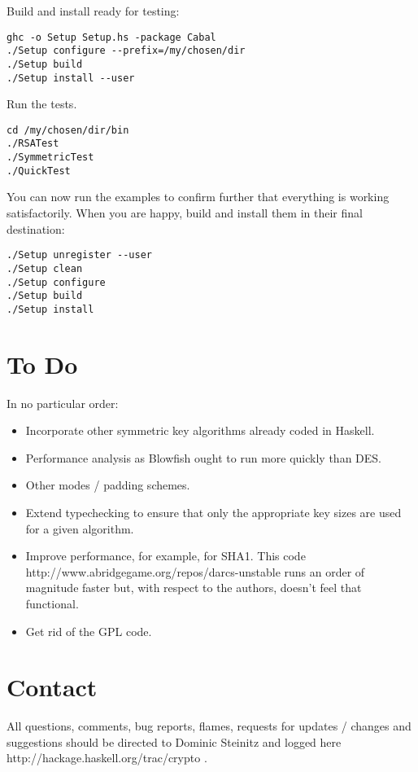 \documentclass{article}
\begin{document}
Build and install ready for testing:

\begin{lstlisting}[frame=single]
ghc -o Setup Setup.hs -package Cabal
./Setup configure --prefix=/my/chosen/dir
./Setup build
./Setup install --user
\end{lstlisting}

Run the tests.

\begin{lstlisting}[frame=single]
cd /my/chosen/dir/bin
./RSATest
./SymmetricTest
./QuickTest
\end{lstlisting}

You can now run the examples to confirm further that everything
is working satisfactorily.
When you are happy, build and install them in
their final destination:

\begin{lstlisting}[frame=single]
./Setup unregister --user
./Setup clean
./Setup configure
./Setup build
./Setup install
\end{lstlisting}

\section{To Do}

In no particular order:

\begin{itemize}
\item
Incorporate other symmetric key algorithms already coded in Haskell.
\item
Performance analysis as Blowfish ought to run more quickly than DES.
\item
Other modes / padding schemes.
\item
Extend typechecking to ensure that only the appropriate key sizes are used
for a given algorithm.
\item
Improve performance, for example, for SHA1. This 
\htmladdnormallinkfoot
{code}
{http://www.abridgegame.org/repos/darcs-unstable}
runs an order of magnitude faster but, with respect to the authors, doesn't
feel that functional.
\item
Get rid of the GPL code.
\end{itemize}

\section{Contact}

All questions, comments, bug reports, flames, requests for 
updates / changes and suggestions should be directed to Dominic Steinitz and
logged
\htmladdnormallinkfoot
{here}
{http://hackage.haskell.org/trac/crypto}
.
\end{document}
